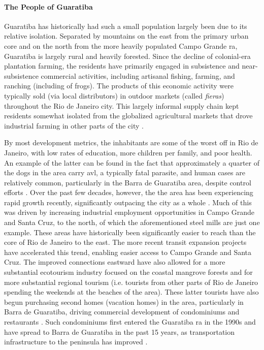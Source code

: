 \paragraph{The People of Guaratiba} \label{sec:guaratiba-people} \leavevmode\newline

Guaratiba has historically had such a small population largely been due to its relative isolation. Separated by mountains on the east from the primary urban core and on the north from the more heavily populated Campo Grande \ac{ra}, Guaratiba is largely rural and heavily forested. Since the decline of colonial-era plantation farming, the residents have primarily engaged in subsistence and near-subsistence commercial activities, including artisanal fishing, farming, and ranching (including of frogs). The products of this economic activity were typically sold (via local distributors) in outdoor markets (called \textit{fieras}) throughout the Rio de Janeiro city. This largely informal supply chain kept residents somewhat isolated from the globalized agricultural markets that drove industrial farming in other parts of the city \cite{fernandesDecodificandoGeografiasPreteritas2010}.

By most development metrics, the inhabitants are some of the worst off in Rio de Janeiro, with low rates of education, more children per family, and poor health. An example of the latter can be found in the fact that approximately a quarter of the dogs in the area carry \ac{avl}, a typically fatal parasite, and human cases are relatively common, particularly in the Barra de Guaratiba area, despite control efforts \cite{cabreraCanineVisceralLeishmaniasis2003}. Over the past few decades, however, the the area has been experiencing rapid growth recently, significantly outpacing the city as a whole \cite{pizzolatoLOCALIZACAOESCOLASPUBLICAS2013}. Much of this was driven by increasing industrial employment opportunities in Campo Grande and Santa Cruz, to the north, of which the aforementioned steel mills are just one example. These areas have historically been significantly easier to reach than the core of Rio de Janeiro to the east. The more recent transit expansion projects have accelerated this trend, enabling easier access to Campo Grande and Santa Cruz. The improved connections eastward have also allowed for a more substantial ecotourism industry focused on the coastal mangrove forests and for more substantial regional tourism (i.e. tourists from other parts of Rio de Janeiro spending the weekends at the beaches of the area). These latter tourists have also begun purchasing second homes (vacation homes) in the area, particularly in Barra de Guaratiba, driving commercial development of condominiums and restaurants \cite{herzogGuaratibaVerdeSubsidios2009}. Such condominiums first entered the Guaratiba \ac{ra} in the 1990s and have spread to Barra de Guaratiba in the past 15 years, as transportation infrastructure to the peninsula has improved \cite{fernandesDecodificandoGeografiasPreteritas2010}. 

